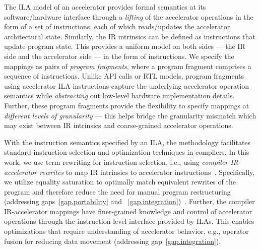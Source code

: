 %
The ILA model of an accelerator provides formal semantics at its software/hardware interface through a \emph{lifting} of the accelerator operations in the form of a set of instructions,
each of which reads/updates the accelerator architectural state. Similarly, the IR intrinsics can be defined as instructions that update program state.
%
%
This provides a uniform model on both sides --- the IR side and the accelerator side --- in the form of instructions. We
specify 
the mappings as pairs of \emph{program fragments}, where a program fragment comprises a sequence of instructions.
%
Unlike API calls or RTL models, program fragments using accelerator ILA instructions capture the underlying accelerator operation semantics while \emph{abstracting} out low-level hardware implementation details.
%
Further, these program fragments provide the flexibility to specify mappings at \emph{different levels of granularity} --- this helps bridge the granularity mismatch which may exist between IR intrinsics and coarse-grained accelerator operations.

%


With the instruction semantics specified by an ILA, the {\TLA} methodology facilitates standard instruction selection and optimization techniques in compilers.
%
In this work, we use term rewriting for instruction selection, i.e., using \emph{compiler IR-accelerator rewrites} to map IR intrinsics to accelerator instructions~\cite{dershowitz1993taste,baader1999term,blindell2016instruction}.
%
Specifically, we utilize equality saturation to optimally match equivalent rewrites of the program and therefore reduce the need for manual program restructuring (addressing gaps~\ref{gap.portability} and ~\ref{gap.integration})~\cite{tate2011equality,stepp2011equality}.
%
Further, the compiler IR-accelerator mappings have finer-grained knowledge and control of accelerator operations through the instruction-level interface provided by ILAs.
%
This enables optimizations that require understanding of accelerator behavior, e.g., operator fusion for reducing data movement (addressing gap~\ref{gap.integration}).

